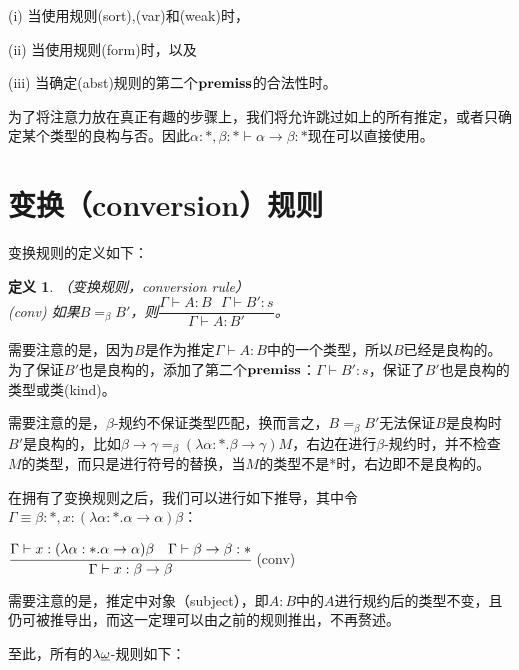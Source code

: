 \documentclass[UTF8]{article}
\newtheorem{thm}{定义}[section]
\begin{document}
		(i) 当使用规则(sort),(var)和(weak)时，
		
		(ii) 当使用规则(form)时，以及
		
		(iii) 当确定(abst)规则的第二个$\bf premiss$的合法性时。
		
		为了将注意力放在真正有趣的步骤上，我们将允许跳过如上的所有推定，或者只确定某个类型的良构与否。因此$\alpha:*,\beta:*\vdash\alpha\rightarrow\beta:*$现在可以直接使用。
		
	\section{变换（conversion）规则}
		\noindent
		变换规则的定义如下：
		
		\begin{thm}（变换规则，conversion rule）\\
			
			(conv) 如果$B=_\beta B'$，则$\dfrac{\Gamma\vdash A:B\ \ \ \Gamma\vdash B':s}{\Gamma\vdash A:B'}$。
		\end{thm}
	
		需要注意的是，因为$B$是作为推定$\Gamma\vdash A:B$中的一个类型，所以$B$已经是良构的。为了保证$B'$也是良构的，添加了第二个$\bf premiss$：$\Gamma\vdash B':s$，保证了$B'$也是良构的类型或类(kind)。
		
		需要注意的是，$\beta$-规约不保证类型匹配，换而言之，$B=_\beta B'$无法保证$B$是良构时$B'$是良构的，比如$\beta\rightarrow\gamma=_\beta(\lambda\alpha:*.\beta\rightarrow\gamma)M$，右边在进行$\beta$-规约时，并不检查$M$的类型，而只是进行符号的替换，当$M$的类型不是*时，右边即不是良构的。
		
		在拥有了变换规则之后，我们可以进行如下推导，其中令$\Gamma\equiv\beta:*,x:(\lambda\alpha:*.\alpha\rightarrow\alpha)\beta$：
		
		$\cfrac{\Gamma\vdash x:(\lambda\alpha:*.\alpha\rightarrow\alpha)\beta\ \ \ \Gamma\vdash\beta\rightarrow\beta:*}{\Gamma\vdash x:\beta\rightarrow\beta}$ (conv)
		
		需要注意的是，推定中对象（subject），即$A:B$中的$A$进行规约后的类型不变，且仍可被推导出，而这一定理可以由之前的规则推出，不再赘述。
		
		至此，所有的$\lambda{\uline{\omega}}$-规则如下：
		
	
\end{document}
